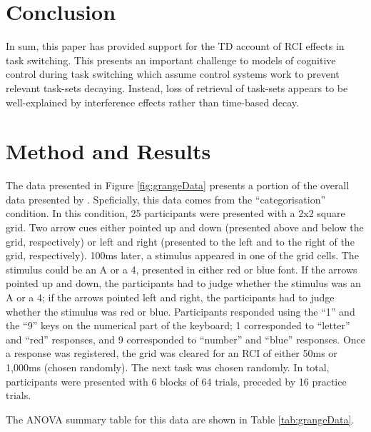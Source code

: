 \documentclass[a4paper, jou, natbib]{apa6}
\begin{document}
\section{Conclusion}
In sum, this paper has provided support for the TD account of RCI effects in task switching. This presents an important challenge to models of cognitive control during task switching which assume control systems work to prevent relevant task-sets decaying. Instead, loss of retrieval of task-sets appears to be well-explained by interference effects rather than time-based decay.





\appendix
\section{Method and Results \citep{Grangeinrevision}}
The data presented in Figure \ref{fig:grangeData} presents a portion of the overall data presented by \cite{Grangeinrevision}. Speficially, this data comes from the ``categorisation'' condition. In this condition, 25 participants were presented with a 2x2 square grid. Two arrow cues either pointed up and down (presented above and below the grid, respectively) or left and right (presented to the left and to the right of the grid, respectively). 100ms later, a stimulus appeared in one of the grid cells. The stimulus could be an A or a 4, presented in either red or blue font. If the arrows pointed up and down, the participants had to judge whether the stimulus was an A or a 4; if the arrows pointed left and right, the participants had to judge whether the stimulus was red or blue. Participants responded using the ``1'' and the ``9'' keys on the numerical part of the keyboard; 1 corresponded to ``letter'' and ``red'' responses, and 9 corresponded to ``number'' and ``blue'' responses. Once a response was registered, the grid was cleared for an RCI of either 50ms or 1,000ms (chosen randomly). The next task was chosen randomly. In total, participants were presented with 6 blocks of 64 trials, preceded by 16 practice trials.

The ANOVA summary table for this data are shown in Table \ref{tab:grangeData}.
\end{document}
